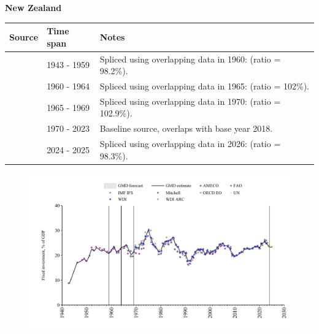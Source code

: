 \documentclass[12pt,a4paper,landscape]{article}
\begin{document}
\begin{adjustbox}{max totalsize={\paperwidth}{\paperheight},center}
\begin{minipage}[t][\textheight][t]{\textwidth}
\vspace*{0.5cm}
{}
\begin{center}
{\Large\bfseries New Zealand}
\end{center}
\vspace{0.5cm}
\begin{table}[H]
\centering
\small
\begin{tabular}{|l|l|l|}
\hline
\textbf{Source} & \textbf{Time span} & \textbf{Notes} \\
\hline
\rowcolor{white}\cite{Mitchell}& 1943 - 1959 &Spliced using overlapping data in 1960: (ratio = 98.2\%).\\
\rowcolor{lightgray}\cite{AMECO}& 1960 - 1964 &Spliced using overlapping data in 1965: (ratio = 102\%).\\
\rowcolor{white}\cite{WDI_ARC}& 1965 - 1969 &Spliced using overlapping data in 1970: (ratio = 102.9\%).\\
\rowcolor{lightgray}\cite{WDI}& 1970 - 2023 &Baseline source, overlaps with base year 2018.\\
\rowcolor{white}\cite{OECD_EO}& 2024 - 2025 &Spliced using overlapping data in 2026: (ratio = 98.3\%).\\
\hline
\end{tabular}
\end{table}
\begin{figure}[H]
\centering
\includegraphics[width=\textwidth,height=0.6\textheight,keepaspectratio]{graphs/NZL_finv_GDP.pdf}
\end{figure}
\end{minipage}
\end{adjustbox}
\end{document}
